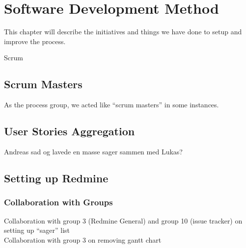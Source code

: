 \chapter{Software Development Method}%
This chapter will describe the initiatives and things we have done to setup and improve the process.

Scrum

\section{Scrum Masters}
As the process group, we acted like ``scrum masters'' in some instances.

\section{User Stories Aggregation}
Andreas sad og lavede en masse sager sammen med Lukas?

\section{Setting up Redmine}
\subsection{Collaboration with Groups}
Collaboration with group 3 (Redmine General) and group 10 (issue tracker) on setting up ``sager'' list\\
Collaboration with group 3 on removing gantt chart